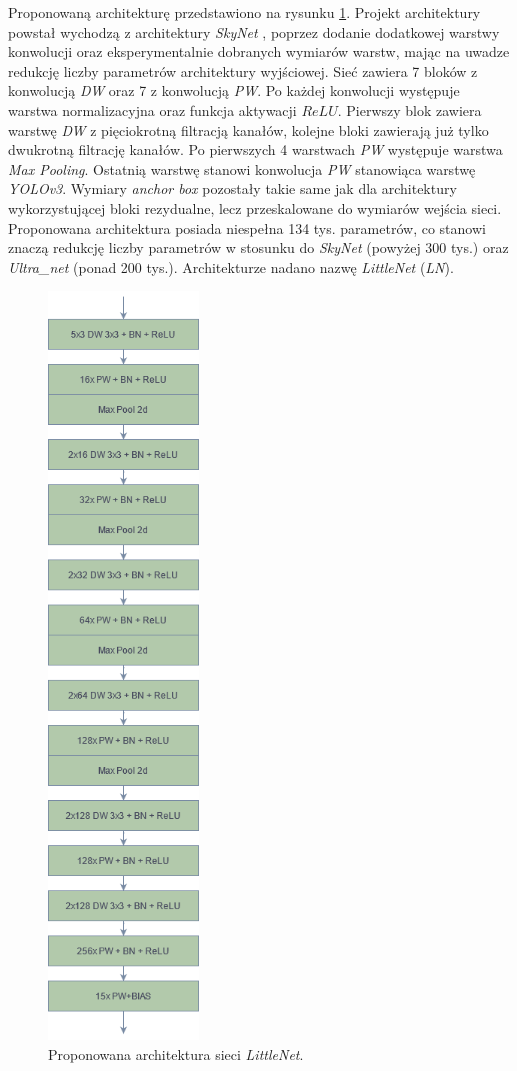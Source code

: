 Proponowaną architekturę przedstawiono na rysunku \ref{fig:LN_arch}. 
Projekt architektury powstał wychodzą z architektury \emph{SkyNet} \cite{skynet}, 
poprzez dodanie dodatkowej warstwy konwolucji oraz eksperymentalnie dobranych wymiarów warstw, mając na uwadze redukcję liczby parametrów architektury wyjściowej. 
Sieć zawiera 7 bloków z konwolucją \emph{DW} oraz 7 z konwolucją \emph{PW}. 
Po każdej konwolucji występuje warstwa normalizacyjna oraz funkcja aktywacji $ReLU$. 
Pierwszy blok zawiera warstwę \emph{DW} z pięciokrotną filtracją kanałów, kolejne bloki zawierają już tylko dwukrotną filtrację kanałów.
Po pierwszych 4 warstwach \emph{PW} występuje warstwa \emph{Max Pooling}. 
Ostatnią warstwę stanowi konwolucja \emph{PW} stanowiąca warstwę \emph{YOLOv3}. 
Wymiary \emph{anchor box} pozostały takie same jak dla architektury wykorzystującej bloki rezydualne, lecz przeskalowane do wymiarów wejścia sieci. 
Proponowana architektura posiada niespełna 134 tys. parametrów, co stanowi znaczą redukcję liczby parametrów w stosunku do \emph{SkyNet} (powyżej 300 tys.) oraz \emph{Ultra\_net} (ponad 200 tys.). 
Architekturze nadano %
nazwę \emph{LittleNet} (\emph{LN}).
\begin{figure}
    \centering
    \includegraphics[width=4cm]{images/LNv1}
    \caption{Proponowana architektura sieci \emph{LittleNet}.}
    \label{fig:LN_arch}
\end{figure}

